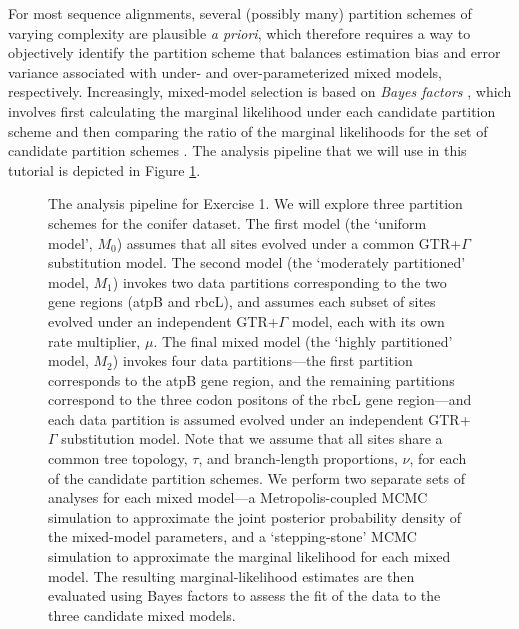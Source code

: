 \documentclass[11pt]{article}
\begin{document}
For most sequence alignments, several (possibly many) partition schemes of varying complexity are plausible {\it a priori}, which therefore requires a way to objectively identify the partition scheme that balances estimation bias and error variance associated with under- and over-parameterized mixed models, respectively.
Increasingly, mixed-model selection is based on \textit{Bayes factors} \citep[{\it e.g.},][]{suchard01}, which involves first calculating the marginal likelihood under each candidate partition scheme and then comparing the ratio of the marginal likelihoods for the set of candidate partition schemes \citep{brandley05,nylander04,mcguire07}.
The analysis pipeline that we will use in this tutorial is depicted in Figure \ref{pipeline}.
\begin{figure}[h!]
\centering
{}
\caption{\small The analysis pipeline for Exercise 1. We will explore three partition schemes for the conifer dataset.
The first model (the `uniform model', $M_0$) assumes that all sites evolved under a common GTR+$\Gamma$ substitution model.
The second model (the `moderately partitioned' model, $M_1$) invokes two data partitions corresponding to the two gene regions (atpB and rbcL), and assumes each subset of sites evolved under an independent GTR+$\Gamma$ model, each with its own rate multiplier, $\mu$.
The final mixed model (the `highly partitioned' model, $M_2$) invokes four data partitions---the first partition corresponds to the atpB gene region, and the remaining partitions correspond to the three codon positons of the rbcL gene region---and each data partition is assumed evolved under an independent GTR+$\Gamma$ substitution model.
Note that we assume that all sites share a common tree topology, $\tau$, and branch-length proportions, $\nu$, for each of the candidate partition schemes.
We perform two separate sets of analyses for each mixed model---a Metropolis-coupled MCMC simulation to approximate the joint posterior probability density of the mixed-model parameters, and a `stepping-stone' MCMC simulation to approximate the marginal likelihood for each mixed model.
The resulting marginal-likelihood estimates are then evaluated using Bayes factors to assess the fit of the data to the three candidate mixed models.  
}
\label{pipeline}
\end{figure}
 
\end{document}

